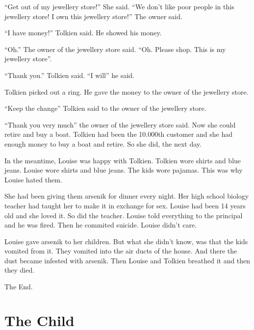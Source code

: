 ``Get out of my jewellery store!'' She said. ``We don't like poor
people in this jewellery store! I own this jewellery store!'' The
owner said.



``I have money!'' Tolkien said. He showed his money.



``Oh.'' The owner of the jewellery store said. ``Oh. Please shop. This
is my jewellery store''.



``Thank you.'' Tolkien said. ``I will'' he said.



Tolkien picked out a ring. He gave the money to the owner of the
jewellery store.



``Keep the change'' Tolkien said to the owner of the jewellery
store.



``Thank you very much'' the owner of the jewellery store said. Now
she could retire and buy a boat. Tolkien had been the 10.000th
customer and she had enough money to buy a boat and retire. So she
did, the next day.



In the meantime, Louise was happy with Tolkien. Tolkien wore shirts
and blue jeans. Louise wore shirts and blue jeans. The kids wore
pajamas. This was why Louise hated them.



She had been giving them arsenik for dinner every night. Her high
school biology teacher had taught her to make it in exchange for
sex. Louise had been 14 years old and she loved it. So did the
teacher. Louise told everything to the principal and he was fired.
Then he commited suicide. Louise didn't care.



Louise gave arsenik to her children. But what she didn't know, was
that the kids vomited from it. They vomited into the air ducts of
the house. And there the dust became infested with arsenik. Then
Louise and Tolkien breathed it and then they died.



The End. 
 




\chapter{The Child}


